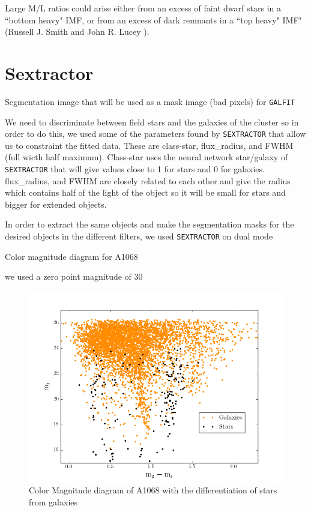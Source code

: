Large M/L ratios could arise either from an excess of faint dwarf stars in a ``bottom heavy" IMF, or from an excess of dark remnants in a ``top heavy" IMF" (Russell J. Smith and John R. Lucey \citeyear{Reference7}).

\section{Sextractor}

Segmentation image that will be used as a mask image (bad pixels) for \texttt{GALFIT}

We need to discriminate between field stars and the galaxies of the cluster so in order to do this, we used some of the parameters found by \texttt{SEXTRACTOR} that allow us to constraint the fitted data. These are class-star, flux\_radius, and FWHM (full wicth half maximum). Class-star uses the neural network star/galaxy of \texttt{SEXTRACTOR} that will give values close to 1 for stars and 0 for galaxies. flux\_radius, and FWHM are closely related to each other and give the radius which contains half of the light of the object so it will be small for stars and bigger for extended objects.

In order to extract the same objects and make the segmentation masks for the desired objects in the different filters, we used \texttt{SEXTRACTOR} on dual mode

Color magnitude diagram for A1068

we used a zero point magnitude of 30

\begin{figure}[H]
\centering
\includegraphics[width=12cm]{images/color_mag.png}
\caption[Color Magnitude diagram of A1068]{Color Magnitude diagram of A1068 with the differentiation of stars from galaxies}
\end{figure}

